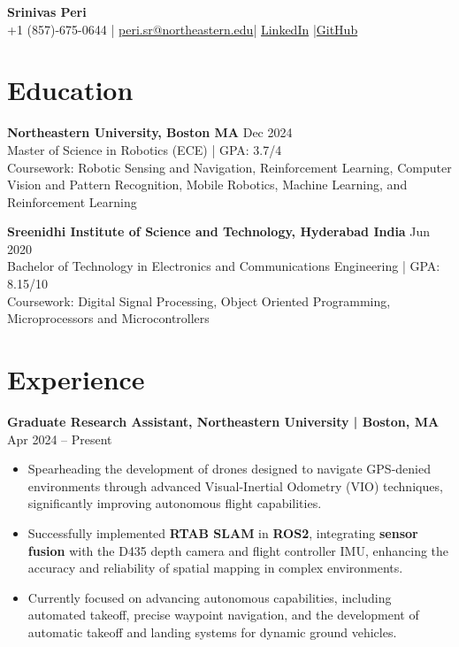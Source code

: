 \documentclass[a4paper,10pt]{article}
\begin{document}
\begin{center}
    {\LARGE \bfseries Srinivas Peri}\\
    +1 (857)-675-0644 | {\href{https://outlook.office.com/mail/}{peri.sr@northeastern.edu}}|
    \href{https://www.linkedin.com/in/srinivas-peri-yob1998}{LinkedIn} |\href{https://github.com/MAHASHANA/}{GitHub}
\end{center}

\vspace{0.5ex}

\section*{Education}
\noindent\textbf{Northeastern University, Boston MA} \hfill Dec 2024 \\
Master of Science in Robotics (ECE) | GPA: 3.7/4 \\
Coursework: Robotic Sensing and Navigation, Reinforcement Learning, Computer Vision and Pattern Recognition, Mobile Robotics, Machine Learning, and Reinforcement Learning

\noindent\textbf{Sreenidhi Institute of Science and Technology, Hyderabad India} \hfill Jun 2020 \\
Bachelor of Technology in Electronics and Communications Engineering | GPA: 8.15/10 \\
Coursework: Digital Signal Processing, Object Oriented Programming, Microprocessors and Microcontrollers

\section*{Experience}
\noindent\textbf{Graduate Research Assistant, Northeastern University | Boston, MA} \hfill Apr 2024 – Present
\begin{itemize}
    \item Spearheading the development of drones designed to navigate GPS-denied environments through advanced Visual-Inertial Odometry (VIO) techniques, significantly improving autonomous flight capabilities.
    \item Successfully implemented \textbf{RTAB SLAM} in \textbf{ROS2}, integrating \textbf{sensor fusion} with the D435 depth camera and flight controller IMU, enhancing the accuracy and reliability of spatial mapping in complex environments.
    \item Currently focused on advancing autonomous capabilities, including automated takeoff, precise waypoint navigation, and the development of automatic takeoff and landing systems for dynamic ground vehicles.
\end{itemize}
\end{document}

